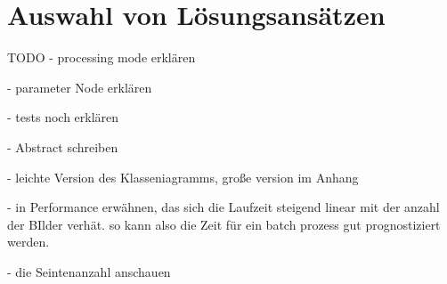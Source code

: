 \section{Auswahl von Lösungsansätzen}

TODO - processing mode erklären

- parameter Node erklären

- tests noch erklären

- Abstract schreiben

- leichte Version des Klasseniagramms, große version im Anhang

- in Performance erwähnen, das sich die Laufzeit steigend linear mit der anzahl
der BIlder verhät. so kann also die Zeit für ein batch prozess gut prognostiziert
werden.

- die Seintenanzahl anschauen
